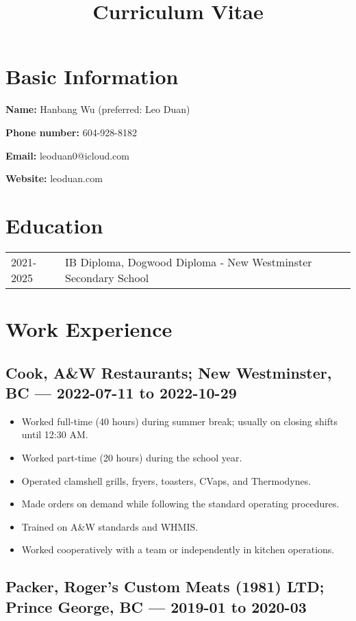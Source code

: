 \documentclass{article}
\title{\textbf{Curriculum Vitae}}
\author{}
\date{}
\begin{document}
\maketitle

\section*{Basic Information}

\textbf{Name:} Hanbang Wu (preferred: Leo Duan)

\textbf{Phone number:} 604-928-8182

\textbf{Email:} leoduan0@icloud.com

\textbf{Website:} leoduan.com

\section*{Education}

\begin{tabular}{@{}ll}
	2021-2025 & IB Diploma, Dogwood Diploma - New Westminster Secondary School \\
\end{tabular}

\section*{Work Experience}

\subsection*{Cook, A\&W Restaurants; New Westminster, BC — 2022-07-11 to 2022-10-29}

\begin{itemize}
	\item Worked full-time (40 hours) during summer break; usually on closing shifts until 12:30 AM.
	\item Worked part-time (20 hours) during the school year.
	\item Operated clamshell grills, fryers, toasters, CVaps, and Thermodynes.
	\item Made orders on demand while following the standard operating procedures.
	\item Trained on A\&W standards and WHMIS.
	\item Worked cooperatively with a team or independently in kitchen operations.
\end{itemize}

\subsection*{Packer, Roger's Custom Meats (1981) LTD; Prince George, BC — 2019-01 to 2020-03}
\end{document}

